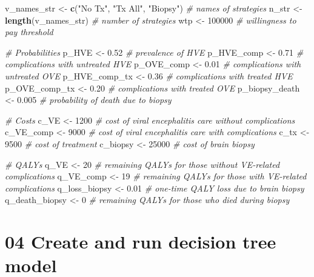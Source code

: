\documentclass[
]{article}
\newenvironment{Shaded}{\begin{snugshade}}{\end{snugshade}}
\newcommand{\CommentTok}[1]{\textcolor[rgb]{0.56,0.35,0.01}{\textit{#1}}}
\newcommand{\DecValTok}[1]{\textcolor[rgb]{0.00,0.00,0.81}{#1}}
\newcommand{\FloatTok}[1]{\textcolor[rgb]{0.00,0.00,0.81}{#1}}
\newcommand{\KeywordTok}[1]{\textcolor[rgb]{0.13,0.29,0.53}{\textbf{#1}}}
\newcommand{\NormalTok}[1]{#1}
\newcommand{\StringTok}[1]{\textcolor[rgb]{0.31,0.60,0.02}{#1}}
\begin{document}
\begin{Shaded}
\begin{Highlighting}[]
\NormalTok{v_names_str    <-}\StringTok{ }\KeywordTok{c}\NormalTok{(}\StringTok{"No Tx"}\NormalTok{, }\StringTok{"Tx All"}\NormalTok{, }\StringTok{"Biopsy"}\NormalTok{)  }\CommentTok{# names of strategies}
\NormalTok{n_str          <-}\StringTok{ }\KeywordTok{length}\NormalTok{(v_names_str)             }\CommentTok{# number of strategies}
\NormalTok{wtp            <-}\StringTok{ }\DecValTok{100000}                          \CommentTok{# willingness to pay threshold}

\CommentTok{# Probabilities}
\NormalTok{p_HVE          <-}\StringTok{ }\FloatTok{0.52}   \CommentTok{# prevalence of HVE}
\NormalTok{p_HVE_comp     <-}\StringTok{ }\FloatTok{0.71}   \CommentTok{# complications with untreated HVE}
\NormalTok{p_OVE_comp     <-}\StringTok{ }\FloatTok{0.01}   \CommentTok{# complications with untreated OVE}
\NormalTok{p_HVE_comp_tx  <-}\StringTok{ }\FloatTok{0.36}   \CommentTok{# complications with treated HVE}
\NormalTok{p_OVE_comp_tx  <-}\StringTok{ }\FloatTok{0.20}   \CommentTok{# complications with treated OVE}
\NormalTok{p_biopsy_death <-}\StringTok{ }\FloatTok{0.005}  \CommentTok{# probability of death due to biopsy}

\CommentTok{# Costs}
\NormalTok{c_VE           <-}\StringTok{ }\DecValTok{1200}   \CommentTok{# cost of viral encephalitis care without complications}
\NormalTok{c_VE_comp      <-}\StringTok{ }\DecValTok{9000}   \CommentTok{# cost of viral encephalitis care with complications}
\NormalTok{c_tx           <-}\StringTok{ }\DecValTok{9500}   \CommentTok{# cost of treatment}
\NormalTok{c_biopsy       <-}\StringTok{ }\DecValTok{25000}  \CommentTok{# cost of brain biopsy}

\CommentTok{# QALYs}
\NormalTok{q_VE           <-}\StringTok{ }\DecValTok{20}     \CommentTok{# remaining QALYs for those without VE-related complications}
\NormalTok{q_VE_comp      <-}\StringTok{ }\DecValTok{19}     \CommentTok{# remaining QALYs for those with VE-related complications}
\NormalTok{q_loss_biopsy  <-}\StringTok{ }\FloatTok{0.01}   \CommentTok{# one-time  QALY loss due to brain biopsy}
\NormalTok{q_death_biopsy <-}\StringTok{ }\DecValTok{0}      \CommentTok{# remaining QALYs for those who died during biopsy}
\end{Highlighting}
\end{Shaded}

\hypertarget{create-and-run-decision-tree-model}{%
\section{04 Create and run decision tree
model}\label{create-and-run-decision-tree-model}}
\end{document}
